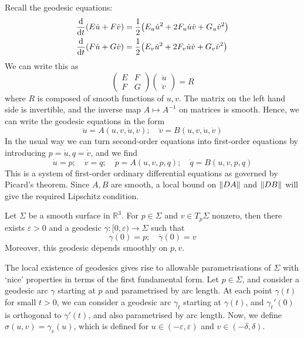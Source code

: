 \documentclass[a4paper]{article}
\renewcommand{\epsilon}{\varepsilon}
\begin{document}
Recall the geodesic equations:
\begin{align*}
	\dv{t} \qty(E \dot u + F \dot v) & = \frac{1}{2} \qty( E_u \dot u^2 + 2F_u \dot u \dot v + G_u \dot v^2 ) \\
	\dv{t} \qty(F \dot u + G \dot v) & = \frac{1}{2} \qty( E_v \dot u^2 + 2F_v \dot u \dot v + G_v \dot v^2 )
\end{align*}
We can write this as
\[
	\begin{pmatrix}
		E & F \\
		F & G
	\end{pmatrix} \begin{pmatrix}
		\ddot u \\
		\ddot v
	\end{pmatrix}= R
\]
where \( R \) is composed of smooth functions of \( u,v \).
The matrix on the left hand side is invertible, and the inverse map \( A \mapsto A^{-1} \) on matrices is smooth.
Hence, we can write the geodesic equations in the form
\[
	\ddot u = A(u, v, \dot u, \dot v);\quad \ddot v = B(u, v, \dot u, \dot v)
\]
In the usual way we can turn second-order equations into first-order equations by introducing \( p = \dot u, q = \dot v \), and we find
\[
	\dot u = p;\quad \dot v = q;\quad \dot p = A(u,v,p,q);\quad \dot q = B(u,v,p,q)
\]
This is a system of first-order ordinary differential equations as governed by Picard's theorem.
Since \( A, B \) are smooth, a local bound on \( \norm{DA} \) and \( \norm{DB} \) will give the required Lipschitz condition.
\begin{corollary}
	Let \( \Sigma \) be a smooth surface in \( \mathbb R^3 \).
	For \( p \in \Sigma \) and \( v \in T_p \Sigma \) nonzero, then there exists \( \varepsilon > 0 \) and a geodesic \( \gamma \colon [0,\varepsilon) \to \Sigma \) such that
	\[
		\gamma(0) = p;\quad \dot \gamma(0) = v
	\]
	Moreover, this geodesic depends smoothly on \( p,v \).
\end{corollary}
The local existence of geodesics gives rise to allowable parametrisations of \( \Sigma \) with `nice' properties in terms of the first fundamental form.
Let \( p \in \Sigma \), and consider a geodesic arc \( \gamma \) starting at \( p \) and parametrised by arc length.
At each point \( \gamma(t) \) for small \( t > 0 \), we can consider a geodesic arc \( \gamma_t \) starting at \( \gamma(t) \), and \( \gamma_t'(0) \) is orthogonal to \( \gamma'(t) \), and also parametrised by arc length.
Now, we define \( \sigma(u,v) = \gamma_v(u) \), which is defined for \( u \in (-\epsilon,\varepsilon) \) and \( v \in (-\delta,\delta) \).
\end{document}
